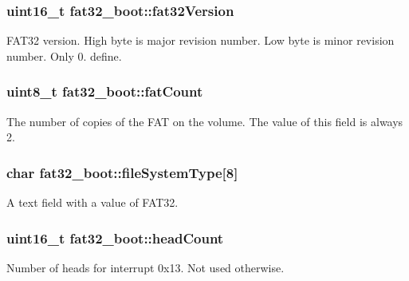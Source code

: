 \subsubsection[{\texorpdfstring{fat32\+Version}{fat32Version}}]{\setlength{\rightskip}{0pt plus 5cm}uint16\+\_\+t fat32\+\_\+boot\+::fat32\+Version}\hypertarget{structfat32__boot_a29c37e1163772493efb524c5ca0e1aa8}{}\label{structfat32__boot_a29c37e1163772493efb524c5ca0e1aa8}
F\+A\+T32 version. High byte is major revision number. Low byte is minor revision number. Only 0. define. 
\subsubsection[{\texorpdfstring{fat\+Count}{fatCount}}]{\setlength{\rightskip}{0pt plus 5cm}uint8\+\_\+t fat32\+\_\+boot\+::fat\+Count}\hypertarget{structfat32__boot_a7882fa8744bd171bfa1512bd442574bc}{}\label{structfat32__boot_a7882fa8744bd171bfa1512bd442574bc}
The number of copies of the F\+AT on the volume. The value of this field is always 2. 
\subsubsection[{\texorpdfstring{file\+System\+Type}{fileSystemType}}]{\setlength{\rightskip}{0pt plus 5cm}char fat32\+\_\+boot\+::file\+System\+Type\mbox{[}8\mbox{]}}\hypertarget{structfat32__boot_a13ee6c63e17d634b6826bfdfa94cbd78}{}\label{structfat32__boot_a13ee6c63e17d634b6826bfdfa94cbd78}
A text field with a value of F\+A\+T32. 
\subsubsection[{\texorpdfstring{head\+Count}{headCount}}]{\setlength{\rightskip}{0pt plus 5cm}uint16\+\_\+t fat32\+\_\+boot\+::head\+Count}\hypertarget{structfat32__boot_a1a5298db692526bc64243766d6b54181}{}\label{structfat32__boot_a1a5298db692526bc64243766d6b54181}
Number of heads for interrupt 0x13. Not used otherwise. 
